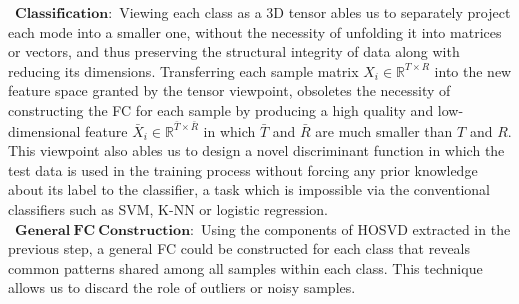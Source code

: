 \documentclass[journal]{IEEEtran}
\begin{document}
	\textbullet\ $\mathbf{Classification:}$ Viewing each class as a 3D tensor ables us to separately project each mode into a smaller one, without the necessity of unfolding it into matrices or vectors, and thus preserving the structural integrity of data along with reducing its dimensions. Transferring each sample matrix $X_i\in \mathbb{R}^{T \times R}$ into the new feature space granted by the tensor viewpoint, obsoletes the necessity of constructing the FC for each sample by producing a high quality and low-dimensional feature $\bar{X}_i \in \mathbb{R}^{\bar{T} \times \bar{R}}$ in which $\bar{T}$ and $\bar{R}$ are much smaller than $T$ and $R$. This viewpoint also ables us to design a novel discriminant function in which the test data is used in the training process without forcing any prior knowledge about its label to the classifier, a task which is impossible via the conventional classifiers such as SVM, K-NN or logistic regression. \\
	
	\textbullet\ $\mathbf{General~FC~Construction:}$
	Using the components of HOSVD extracted in the previous step, a general FC could be constructed for each class that reveals common patterns shared among all samples within each class. This technique allows us to discard the role of outliers or noisy samples.   
	
\end{document}
